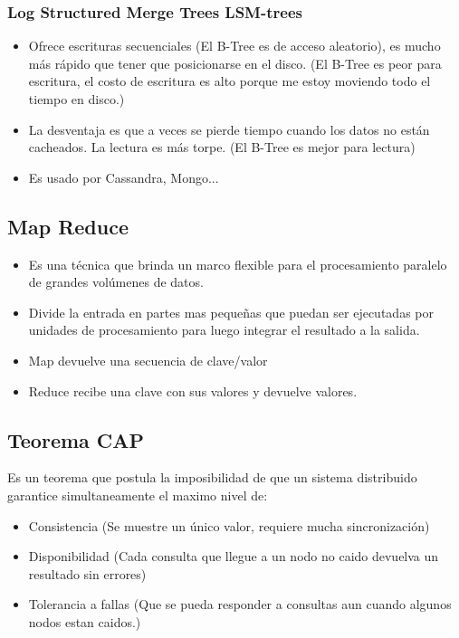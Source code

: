 \subsubsection*{Log Structured Merge Trees LSM-trees}
\begin{itemize}
\item Ofrece escrituras secuenciales (El B-Tree es de acceso aleatorio), es mucho más rápido que tener que posicionarse en el disco. (El B-Tree es peor para escritura, el costo de escritura es alto porque me estoy moviendo todo el tiempo en disco.)
\item La desventaja es que a veces se pierde tiempo cuando los datos no están cacheados. La lectura es más torpe. (El B-Tree es mejor para lectura)
\item Es usado por Cassandra, Mongo...
\end{itemize}

\subsection*{Map Reduce}
\begin{itemize}
    \item Es una técnica que brinda un marco flexible para el procesamiento paralelo de grandes volúmenes de datos.
    \item Divide la entrada en partes mas pequeñas que puedan ser ejecutadas por unidades de procesamiento para luego integrar el resultado a la salida.
    \item Map devuelve una secuencia de clave/valor
    \item Reduce recibe una clave con sus valores y devuelve valores.
\end{itemize}


\subsection*{Teorema CAP}
Es un teorema que postula la imposibilidad de que un sistema distribuido garantice simultaneamente el maximo nivel de:
\begin{itemize}
    \item Consistencia (Se muestre un único valor, requiere mucha sincronización)
    \item Disponibilidad (Cada consulta que llegue a un nodo no caido devuelva un resultado sin errores)
    \item Tolerancia a fallas (Que se pueda responder a consultas aun cuando algunos nodos estan caidos.)
\end{itemize}

